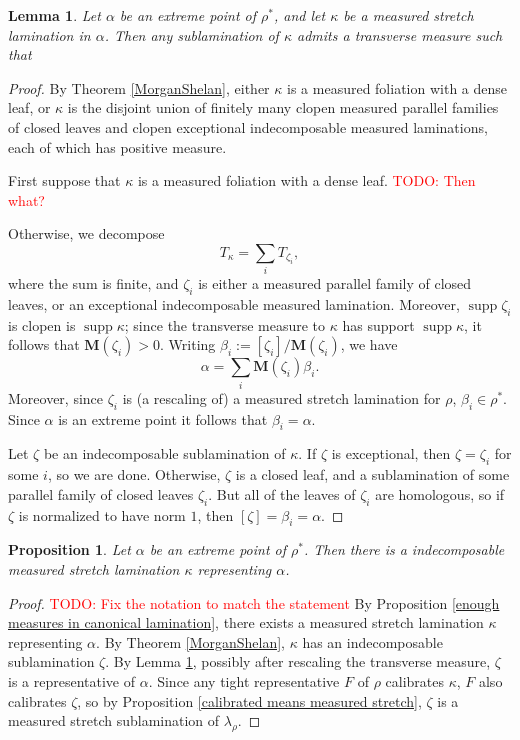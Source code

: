 \documentclass[reqno,11pt]{amsart}
\DeclareMathOperator{\supp}{supp}
\newcommand{\Mass}{\mathbf M}
\newtheorem{lemma}[theorem]{Lemma}
\newtheorem{proposition}[theorem]{Proposition}
\theoremstyle{definition}
\numberwithin{equation}{section}
\newcommand\todo[1]{\textcolor{red}{TODO: #1}}
\begin{document}
\begin{lemma}\label{extreme points are closed under sublaminations}
Let $\alpha$ be an extreme point of $\rho^*$, and let $\kappa$ be a measured stretch lamination in $\alpha$.
Then any sublamination of $\kappa$ admits a transverse measure such that 
\end{lemma}
\begin{proof}
By Theorem \ref{MorganShelan}, either $\kappa$ is a measured foliation with a dense leaf, or $\kappa$ is the disjoint union of finitely many clopen measured parallel families of closed leaves and clopen exceptional indecomposable measured laminations, each of which has positive measure.

First suppose that $\kappa$ is a measured foliation with a dense leaf. \todo{Then what?}

Otherwise, we decompose 
$$T_\kappa = \sum_i T_{\zeta_i},$$
where the sum is finite, and $\zeta_i$ is either a measured parallel family of closed leaves, or an exceptional indecomposable measured lamination.
Moreover, $\supp \zeta_i$ is clopen is $\supp \kappa$; since the transverse measure  to $\kappa$ has support $\supp \kappa$, it follows that $\Mass(\zeta_i) > 0$.
Writing $\beta_i := [\zeta_i]/\Mass(\zeta_i)$, we have
$$\alpha = \sum_i \Mass(\zeta_i) \beta_i.$$
Moreover, since $\zeta_i$ is (a rescaling of) a measured stretch lamination for $\rho$, $\beta_i \in \rho^*$.
Since $\alpha$ is an extreme point it follows that $\beta_i = \alpha$.

Let $\zeta$ be an indecomposable sublamination of $\kappa$.
If $\zeta$ is exceptional, then $\zeta = \zeta_i$ for some $i$, so we are done.
Otherwise, $\zeta$ is a closed leaf, and a sublamination of some parallel family of closed leaves $\zeta_i$.
But all of the leaves of $\zeta_i$ are homologous, so if $\zeta$ is normalized to have norm $1$, then $[\zeta] = \beta_i = \alpha$.
\end{proof}

\begin{proposition}\label{extreme points are indecomposable}
Let $\alpha$ be an extreme point of $\rho^*$.
Then there is a indecomposable measured stretch lamination $\kappa$ representing $\alpha$.
\end{proposition}
\begin{proof}
\todo{Fix the notation to match the statement} By Proposition \ref{enough measures in canonical lamination}, there exists a measured stretch lamination $\kappa$ representing $\alpha$.
By Theorem \ref{MorganShelan}, $\kappa$ has an indecomposable sublamination $\zeta$.
By Lemma \ref{extreme points are closed under sublaminations}, possibly after rescaling the transverse measure, $\zeta$ is a representative of $\alpha$.
Since any tight representative $F$ of $\rho$ calibrates $\kappa$, $F$ also calibrates $\zeta$, so by Proposition \ref{calibrated means measured stretch}, $\zeta$ is a measured stretch sublamination of $\lambda_\rho$.
\end{proof}
\end{document}
